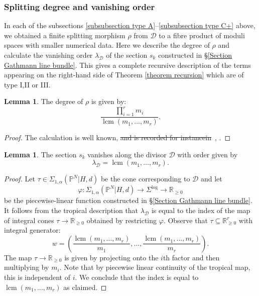 \documentclass[11pt]{amsart}
\newcommand{\lcm}{\operatorname{lcm}}
\newcommand{\PP}{\mathbb P}
\renewcommand{\to}{\rightarrow}
\newcommand{\Dcal}{\mathcal{D}}
\newcommand{\RR}{\mathbb{R}}
\theoremstyle{definition}
\newtheorem{lemma}[thm]{Lemma}
\theoremstyle{definition}
\providecommand{\DIFaddtex}[1]{{\protect\color{blue}\uwave{#1}}} %
\providecommand{\DIFdeltex}[1]{{\protect\color{red}\sout{#1}}}                      %
\providecommand{\DIFaddbegin}{} %
\providecommand{\DIFaddend}{} %
\providecommand{\DIFdelbegin}{} %
\providecommand{\DIFdelend}{} %
\providecommand{\DIFadd}[1]{\texorpdfstring{\DIFaddtex{#1}}{#1}} %
\providecommand{\DIFdel}[1]{\texorpdfstring{\DIFdeltex{#1}}{}} %
\begin{document}
\subsubsection{Splitting degree and vanishing order} \label{subsubsection splitting degree} In each of the subsections \ref{subsubsection type A}--\ref{subsubsection type C+} above, we obtained a finite splitting morphism $\rho$ from $\Dcal$ to a fibre product of moduli spaces with smaller numerical data. Here we describe the degree of $\rho$ and calculate the vanishing order $\lambda_\Dcal$ of the section $s_k$ constructed in \S \ref{Section Gathmann line bundle}. This gives a complete recursive description of the terms appearing on the right-hand side of Theorem \ref{theorem recursion} which are of type I,II or III.

\begin{lemma}\label{lem:saturation} The degree of $\rho$ is given by:
\begin{equation*} \label{degree of gluing} \dfrac{\prod_{i=1}^r m_i}{\lcm(m_1,\ldots,m_r)}. \end{equation*}\end{lemma}
\begin{proof} The calculation is well known, \DIFdelbegin \DIFdel{and is recorded for instancein}\DIFdelend \DIFaddbegin \DIFadd{see for instance}\DIFaddend ~\cite[Section~7.9]{ChenDegeneration}, \cite[Section~5.3]{ACGSDecomposition}.
\end{proof}

\begin{lemma}\label{lemma vanishing order} The section $s_k$ vanishes along the divisor $\Dcal$ with order given by 
\[
\lambda_\Dcal = \lcm(m_1,\ldots,m_r).
\] 
\end{lemma}
\begin{proof} Let $\tau \in \Sigma_{1,\alpha}(\PP^N|H,d)$ be the cone corresponding to $\Dcal$ and let
\begin{equation*} \varphi \colon \Sigma_{1,\alpha}(\PP^N|H,d) \to \Sigma^{\log} \to \RR_{\geq 0} \end{equation*}
be the piecewise-linear function constructed in \S \ref{Section Gathmann line bundle}. It follows from the tropical description that $\lambda_\Dcal$ is equal to the index of the map of integral cones $\tau \to \RR_{\geq 0}$ obtained by restricting $\varphi$. Observe that $\tau \subseteq \RR_{\geq 0}^r$ with integral generator:
\begin{equation*} w = \left( \dfrac{\lcm(m_1,\ldots,m_r)}{m_1},\ldots,\dfrac{\lcm(m_1,\ldots,m_r)}{m_r} \right).\end{equation*}
The map $\tau \to \RR_{\geq 0}$ is given by projecting onto the $i$th factor and then multiplying by $m_i$. Note that by piecewise linear continuity of the tropical map, this is independent of $i$. We conclude that the index is equal to $\lcm(m_1,\ldots,m_r)$ as claimed.\end{proof}
\end{document}
